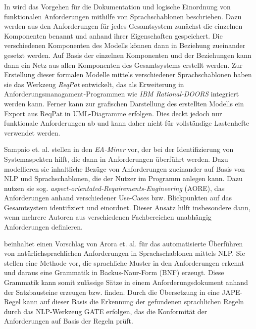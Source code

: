 \documentclass[12pt]{report}
\begin{document}
\vspace{12pt}

In \cite{fh14} wird das Vorgehen für die Dokumentation und logische Einordnung von funktionalen Anforderungen mithilfe von Sprachschablonen beschrieben. Dazu werden aus den Anforderungen für jedes Gesamtsystem zunächst die einzelnen Komponenten benannt und anhand ihrer Eigenschaften gespeichert. Die verschiedenen Komponenten des Modells können dann in Beziehung zueinander gesetzt werden. Auf Basis der einzelnen Komponenten und der Beziehungen kann dann ein Netz aus allen Komponenten des Gesamtsystems erstellt werden. Zur Erstellung dieser formalen Modelle mittels verschiedener Sprachschablonen haben sie das Werkzeug \textit{ReqPat} entwickelt, das als Erweiterung in Anforderungsmanagament-Programmen wie \textit{IBM Rational-DOORS} integriert werden kann. Ferner kann zur grafischen Darstellung des erstellten Modells ein Export aus ReqPat in UML-Diagramme erfolgen. Dies deckt jedoch nur funktionale Anforderungen ab und kann daher nicht für vollständige Lastenhefte verwendet werden.

\vspace{12pt}

Sampaio et. al. stellen in \cite{as05} den \textit{EA-Miner} vor, der bei der Identifizierung von Systemaspekten hilft, die dann in Anforderungen überführt werden. Dazu modellieren sie inhaltliche Bezüge von Anforderungen zueinander auf Basis von NLP und Sprachschablonen, die der Nutzer im Programm anlegen kann. Dazu nutzen sie sog. \textit{aspect-orientated-Requirements-Engineering} (AORE), das Anforderungen anhand verschiedener Use-Cases bzw. Blickpunkten auf das Gesamtsystem identifiziert und einordnet. Dieser Ansatz hilft insbesondere dann, wenn mehrere Autoren aus verschiedenen Fachbereichen unabhängig Anforderungen definieren.

\vspace{12pt}

\cite{ca15} beinhaltet einen Vorschlag von Arora et. al. für das automatisierte Überführen von natürlichsprachlichen Anforderungen in Sprachschablonen mittels NLP. Sie stellen eine Methode vor, die sprachliche Muster in den Anforderungen erkennt und daraus eine Grammatik in Backus-Naur-Form (BNF) erzeugt. Diese Grammatik kann somit zulässige Sätze in einem Anforderungsdokument anhand der Satzbausteine erzeugen bzw. finden. Durch die Übersetzung in eine JAPE-Regel kann auf dieser Basis die Erkennung der gefundenen sprachlichen Regeln durch das NLP-Werkzeug GATE erfolgen, das die Konformität der Anforderungen auf Basis der Regeln prüft. 
\end{document}
